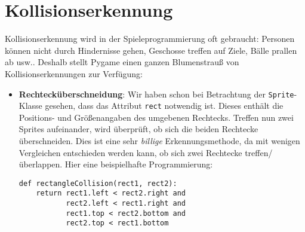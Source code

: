 \section{Kollisionserkennung}
Kollisionserkennung wird in der Spieleprogrammierung  oft gebraucht: Personen können nicht durch Hindernisse gehen, Geschosse treffen auf Ziele, Bälle prallen ab usw.. Deshalb stellt Pygame einen ganzen Blumenstrauß von Kollisionserkennungen zur Verfügung:

\begin{itemize}
    \item \textbf{Rechtecküberschneidung}: Wir haben schon bei Betrachtung der \texttt{Sprite}-Klasse gesehen, dass das Attribut \texttt{rect} notwendig ist. Dieses enthält die Positions- und Größenangaben des umgebenen Rechtecks. Treffen nun zwei Sprites aufeinander, wird überprüft, ob sich die beiden Rechtecke überschneiden. Dies ist eine sehr \emph{billige} Erkennungsmethode, da mit wenigen Vergleichen entschieden werden kann, ob sich zwei Rechtecke treffen/überlappen. Hier eine beispielhafte Programmierung:
\lstset{firstnumber=1}
\begin{lstlisting}
def rectangleCollision(rect1, rect2):
    return rect1.left < rect2.right and
           rect2.left < rect1.right and
           rect1.top < rect2.bottom and
           rect2.top < rect1.bottom
\end{lstlisting}


\begin{figure}[H]
\begin{center}

\end{center}
\end{figure}
\end{itemize}
